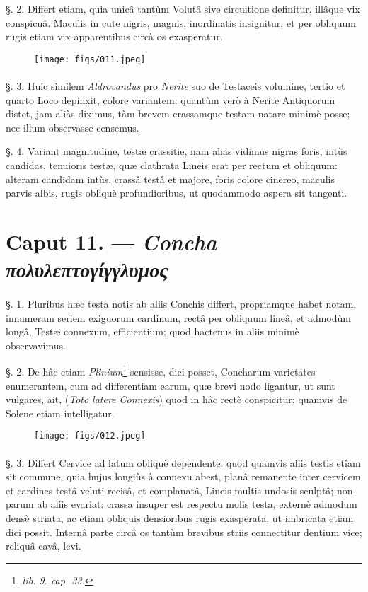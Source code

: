 \documentclass[a4paper, 11pt, oneside, polutonikogreek, german]{article}
\begin{document}
§. 2. Differt etiam, quia unicâ tantùm Volutâ sive circuitione definitur, illâque vix conspicuâ. Maculis in cute nigris, magnis, inordinatis insignitur, et per obliquum rugis etiam vix apparentibus circà os exasperatur.

\begin{figure}[H]
\centering
\texttt{[image: figs/011.jpeg]}

\end{figure}
\paragraph{}
§. 3. Huic similem \emph{Aldrovandus} pro \emph{Nerite} suo de Testaceis volumine, tertio et quarto Loco depinxit, colore variantem: quantùm verò à Nerite Antiquorum distet, jam aliàs diximus, tàm brevem crassamque testam natare minimè posse; nec illum observasse censemus.

§. 4. Variant magnitudine, testæ crassitie, nam alias vidimus nigras foris, intùs candidas, tenuioris testæ, quæ clathrata Lineis erat per rectum et obliquum: alteram candidam intùs, crassâ testâ et majore, foris colore cinereo, maculis parvis albis, rugis obliquè profundioribus, ut quodammodo aspera sit tangenti.

\section{Caput 11. --- \emph{Concha πολυλεπτογίγγλυμος}}
\paragraph{}
§. 1. Pluribus hæc testa notis ab aliis Conchis differt, propriamque habet notam, innumeram seriem exiguorum cardinum, rectâ per obliquum lineâ, et admodùm longâ, Testæ connexum, efficientium; quod hactenus in aliis minimè observavimus.

§. 2. De hâc etiam \emph{Plinium}\footnote{\emph{lib. 9. cap. 33.}} sensisse, dici posset, Concharum varietates enumerantem, cum ad differentiam earum, quæ brevi nodo ligantur, ut sunt vulgares, ait, (\emph{Toto latere Connexis}) quod in hâc rectè conspicitur; quamvis de Solene etiam intelligatur.

\begin{figure}[H]
\centering
\texttt{[image: figs/012.jpeg]}

\end{figure}
\paragraph{}
§. 3. Differt Cervice ad latum obliquè dependente: quod quamvis aliis testis etiam sit commune, quia hujus longiùs à connexu abest, planâ remanente inter cervicem et cardines testâ veluti recisâ, et complanatâ, Lineis multis undosis sculptâ; non parum ab aliis evariat: crassa insuper est respectu molis testa, externè admodum densè striata, ac etiam obliquis densioribus rugis exasperata, ut imbricata etiam dici possit. Internâ parte circâ os tantùm brevibus striis connectitur dentium vice; reliquâ cavâ, levi.
\end{document}
